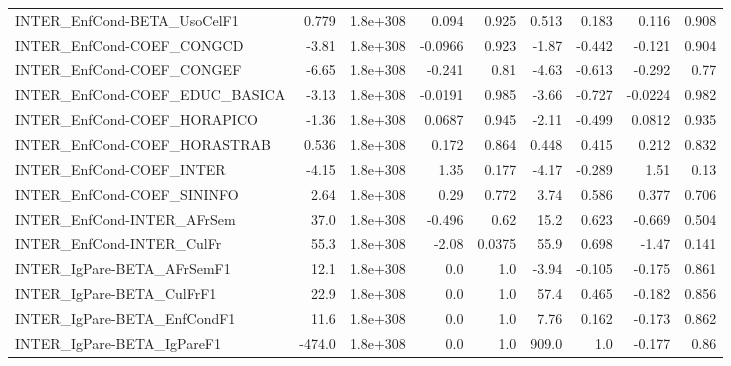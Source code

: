 \begin{tabular}{lrrrrrrrr}
INTER\_EnfCond-BETA\_UsoCelF1           &       0.779 &     1.8e+308 &    0.094 &    0.925 &      0.513 &       0.183 &        0.116 &         0.908 \\
INTER\_EnfCond-COEF\_CONGCD             &       -3.81 &     1.8e+308 &  -0.0966 &    0.923 &      -1.87 &      -0.442 &       -0.121 &         0.904 \\
INTER\_EnfCond-COEF\_CONGEF             &       -6.65 &     1.8e+308 &   -0.241 &     0.81 &      -4.63 &      -0.613 &       -0.292 &          0.77 \\
INTER\_EnfCond-COEF\_EDUC\_BASICA        &       -3.13 &     1.8e+308 &  -0.0191 &    0.985 &      -3.66 &      -0.727 &      -0.0224 &         0.982 \\
INTER\_EnfCond-COEF\_HORAPICO           &       -1.36 &     1.8e+308 &   0.0687 &    0.945 &      -2.11 &      -0.499 &       0.0812 &         0.935 \\
INTER\_EnfCond-COEF\_HORASTRAB          &       0.536 &     1.8e+308 &    0.172 &    0.864 &      0.448 &       0.415 &        0.212 &         0.832 \\
INTER\_EnfCond-COEF\_INTER              &       -4.15 &     1.8e+308 &     1.35 &    0.177 &      -4.17 &      -0.289 &         1.51 &          0.13 \\
INTER\_EnfCond-COEF\_SININFO            &        2.64 &     1.8e+308 &     0.29 &    0.772 &       3.74 &       0.586 &        0.377 &         0.706 \\
INTER\_EnfCond-INTER\_AFrSem            &        37.0 &     1.8e+308 &   -0.496 &     0.62 &       15.2 &       0.623 &       -0.669 &         0.504 \\
INTER\_EnfCond-INTER\_CulFr             &        55.3 &     1.8e+308 &    -2.08 &   0.0375 &       55.9 &       0.698 &        -1.47 &         0.141 \\
INTER\_IgPare-BETA\_AFrSemF1            &        12.1 &     1.8e+308 &      0.0 &      1.0 &      -3.94 &      -0.105 &       -0.175 &         0.861 \\
INTER\_IgPare-BETA\_CulFrF1             &        22.9 &     1.8e+308 &      0.0 &      1.0 &       57.4 &       0.465 &       -0.182 &         0.856 \\
INTER\_IgPare-BETA\_EnfCondF1           &        11.6 &     1.8e+308 &      0.0 &      1.0 &       7.76 &       0.162 &       -0.173 &         0.862 \\
INTER\_IgPare-BETA\_IgPareF1            &      -474.0 &     1.8e+308 &      0.0 &      1.0 &      909.0 &         1.0 &       -0.177 &          0.86 \\

\end{tabular}
